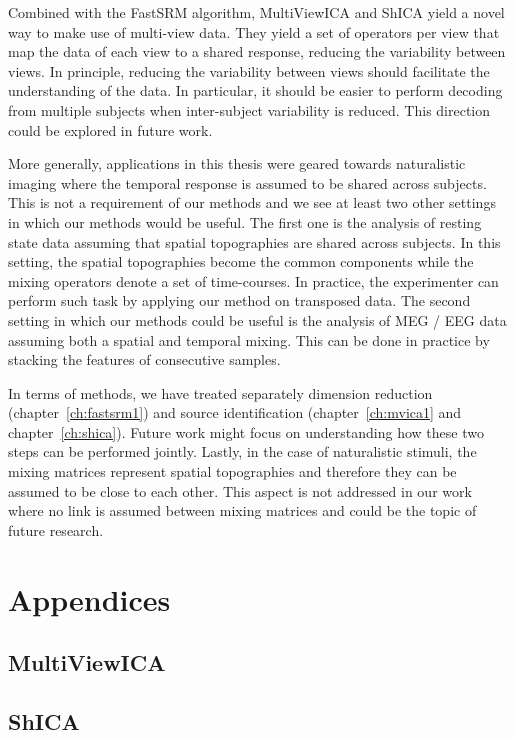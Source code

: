 \documentclass[ twoside,openright,titlepage,numbers=noenddot,%
                headinclude,footinclude,cleardoublepage=empty,abstract=on,
                BCOR=5mm,paper=a4,fontsize=11pt, 
                ]{scrreprt}
\begin{document}
Combined with the FastSRM algorithm, MultiViewICA and ShICA yield a novel way to
make use of multi-view data. They yield a set of operators per view that map
the data of each view to a shared response, reducing the variability between views.
In principle, reducing the variability between views should facilitate the
understanding of the data. In particular, it should be easier to perform
decoding from multiple subjects when inter-subject variability is reduced.
This direction could be explored in future work.

More generally, applications in this thesis were geared towards naturalistic imaging where the temporal response is assumed to be shared
across subjects. This is not a requirement of our methods and we see at least two other
settings in which our methods would be useful. The first
one is the analysis of resting state data assuming that spatial topographies are
shared across subjects. In this setting, the spatial topographies become the
common components while the mixing operators denote a set of time-courses. In
practice, the experimenter can perform such task by applying our method on
transposed data.
The second setting in which our methods could be useful is the analysis of MEG / EEG data assuming both a spatial and
temporal mixing. This can be done in practice by stacking the features of
consecutive samples.

In terms of methods, we have treated separately dimension reduction
(chapter~\ref{ch:fastsrm1}) and source identification (chapter~\ref{ch:mvica1}
and chapter~\ref{ch:shica}). Future work might focus on understanding how these
two steps can be performed jointly. Lastly, in the case of naturalistic stimuli,
the mixing matrices represent spatial topographies and therefore they can be
assumed to be close to each other. This aspect is not addressed in our work
where no link is assumed between mixing matrices and could be the topic of
future research.




% 

\cleardoublepage

\appendix
\part{Appendices}
\chapter{MultiViewICA}

\chapter{ShICA}


\end{document}
